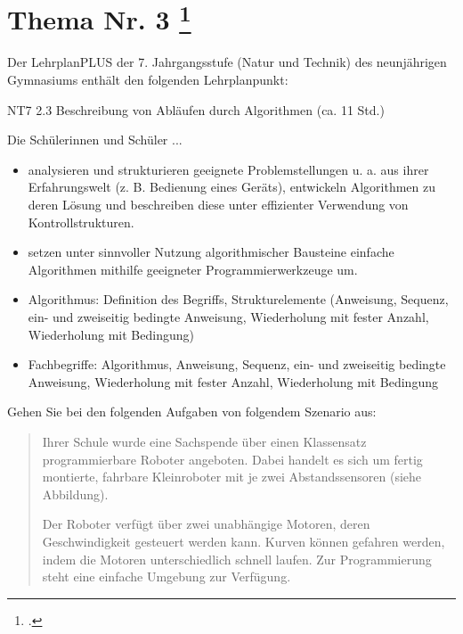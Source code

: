 \documentclass{lehramt-informatik-aufgabe}
\begin{document}
\liAufgabenTitel{}
\section{Thema Nr. 3
\index{}
\footcite{examen:66118:2021:03}}

Der LehrplanPLUS der 7. Jahrgangsstufe (Natur und Technik) des
neunjährigen Gymnasiums enthält den folgenden Lehrplanpunkt:

\begin{liKasten}
NT7 2.3 Beschreibung von Abläufen durch Algorithmen (ca. 11 Std.)


Die Schülerinnen und Schüler ...

\begin{itemize}
\item analysieren und strukturieren geeignete Problemstellungen u. a.
aus ihrer Erfahrungswelt (z. B. Bedienung eines Geräts), entwickeln
Algorithmen zu deren Lösung und beschreiben diese unter effizienter
Verwendung von Kontrollstrukturen.

\item setzen unter sinnvoller Nutzung algorithmischer Bausteine einfache
Algorithmen mithilfe geeigneter Programmierwerkzeuge um.
\end{itemize}


\begin{itemize}
\item Algorithmus: Definition des Begriffs, Strukturelemente (Anweisung,
Sequenz, ein- und zweiseitig bedingte Anweisung, Wiederholung mit fester
Anzahl, Wiederholung mit Bedingung)

\item Fachbegriffe: Algorithmus, Anweisung, Sequenz, ein- und zweiseitig
bedingte Anweisung, Wiederholung mit fester Anzahl, Wiederholung mit
Bedingung
\end{itemize}
\end{liKasten}


\noindent
Gehen Sie bei den folgenden Aufgaben von folgendem Szenario aus:

\begin{quote}
Ihrer Schule wurde eine Sachspende über einen Klassensatz
programmierbare Roboter angeboten. Dabei handelt es sich um fertig
montierte, fahrbare Kleinroboter mit je zwei Abstandssensoren (siehe
Abbildung).

Der Roboter verfügt über zwei unabhängige Motoren, deren Geschwindigkeit
gesteuert werden kann. Kurven können gefahren werden, indem die Motoren
unterschiedlich schnell laufen. Zur Programmierung steht eine einfache
Umgebung zur Verfügung.
\end{quote}
\end{document}
